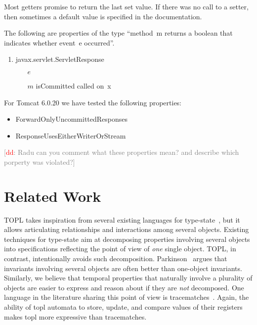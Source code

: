 \documentclass{sigplanconf}[10pt] %
\newcommand{\noterg}[2]{\textcolor{gray}{[\textcolor{red}{#1}: #2]}}
\newcommand{\dd}[1]{\noterg{dd}{#1}}
\newcommand{\dinocomment}[1]{\dd{#1}}
\begin{document}
Most getters promise to return the last set value.
If there was no call to a setter, then sometimes a default value is specified in the documentation.

The following are properties of the type ``method~\textsf{m} returns a boolean that indicates whether event~\textsf{e} occurred''.

\begin{enumerate}
\item
\textsf{javax.servlet.ServletResponse}
  \begin{itemize}
  \item[$e$]
  \item[$m$] \textsf{isCommitted} called on~\textsf{x}
  \end{itemize}
\end{enumerate}

For Tomcat  6.0.20  we have tested the following properties:
\begin{itemize}
\item ForwardOnlyUncommittedResponses
\item ResponseUsesEitherWriterOrStream
\end{itemize}
\dinocomment{Radu can you comment what these properties mean? and describe which porperty was violated?}

\section{Related Work}\label{sec:related} %

TOPL takes inspiration from several existing  languages for type-state~\cite{strom1986,dblp:conf/oopsla/bierhoffa07,dblp:conf/oopsla/naeeml08,disney2011,ball2002}, but  it allows articulating  relationships and interactions among several objects.
Existing techniques for type-state aim at decomposing properties involving several objects into specifications reflecting the point of view of {\em one} single object.
TOPL, in contrast,  intentionally avoids such decomposition.
Parkinson~\cite{parkinson-iwaco2007} argues that invariants involving several objects are often better than one-object invariants.
Similarly, we believe that temporal properties that naturally involve a plurality of objects are easier to express and reason about if they are \emph{not} decomposed.
One language in the literature sharing this point of view is tracematches~\cite{DBLP:conf/oopsla/AllanACHKLMSST05}.
Again, the ability of topl automata to store,  update, and compare values of their registers makes topl more expressive than tracematches.
\end{document}
